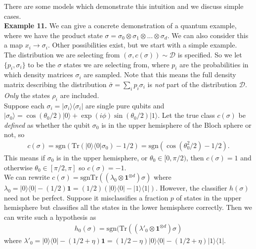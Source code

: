 \documentclass[onecolumn,prx, superscriptaddress,longbibliography,margin=1mm 11pt]{revtex4-2}
\renewcommand{\mathbf}[1]{\boldsymbol{#1}}
\begin{document}
    There are some models which demonstrate this intuition and we discuss simple cases. \\
    
\noindent \textbf{Example 11.}
     We can give a concrete demonstration of a quantum example, where we have the product state $\sigma=\sigma_0\otimes \sigma_1 \otimes...\otimes \sigma_d$. We can also consider this a map $x_i\rightarrow \sigma_i$. Other possibilities exist, but  we start with a simple example. \\
     
     The distribution we are selecting from $(\sigma, c(\sigma)) \sim \mathcal{D}$ is specified. So we let $\{p_i, \sigma_i\}$ to be the $\sigma$ states we are selecting from, where $p_i$ are the probabilities in which density matrices $\sigma_i$ are sampled. Note that this means the full density matrix describing the distribution $\bar{\sigma}=\sum_i p_i \sigma_i$ is \textit{not} part of the distribution $\mathcal{D}$. \textit{Only} the states $\rho_i$ are included. \\
     
     Suppose each $\sigma_i=|\sigma_i\rangle \langle \sigma_i|$ are single pure qubits and $|\sigma_0\rangle=\cos(\theta_0/2)|0\rangle+\exp(i \phi) \sin(\theta_0/2)|1\rangle$. Let the true class $c(\sigma)$ be \textit{defined} as whether the qubit $\sigma_0$ is in the upper hemisphere of the Bloch sphere or not, so 
     \begin{align}
         c(\sigma)=\text{sgn}(\text{Tr}(|0\rangle \langle 0| \sigma_0)-1/2)=\text{sgn}(\cos(\theta_0^2/2)-1/2).
     \end{align}
      This means if $\sigma_0$ is in the upper hemisphere, or $\theta_0 \in [0, \pi/2)$, then $c(\sigma)=1$ and otherwise $\theta_0 \in [\pi/2, \pi]$ so $c(\sigma)=-1$. \\
      
      We can rewrite $c(\sigma)=\text{sgn}\text{Tr}((\lambda_0 \otimes \mathbf{1}^{\otimes d}) \sigma)$ where $\lambda_0=|0\rangle \langle 0|-(1/2)\mathbf{1}=(1/2)(|0\rangle \langle 0|-|1\rangle \langle 1|)$. However, the classifier $h(\sigma)$ need not be perfect. Suppose it misclassifies a fraction $p$ of states in the upper hemisphere but classifies all the states in the lower hemisphere correctly. Then we can write such a hypothesis as 
      \begin{align}
          h_0(\sigma)=\text{sgn}(\text{Tr}((\lambda'_0 \otimes \mathbf{1}^{\otimes d}) \sigma) 
      \end{align}
      where $\lambda'_0=|0\rangle \langle 0|-(1/2+\eta)\mathbf{1}=(1/2-\eta)|0\rangle \langle 0|-(1/2+\eta)|1\rangle \langle 1|$.\\
      
\end{document}

